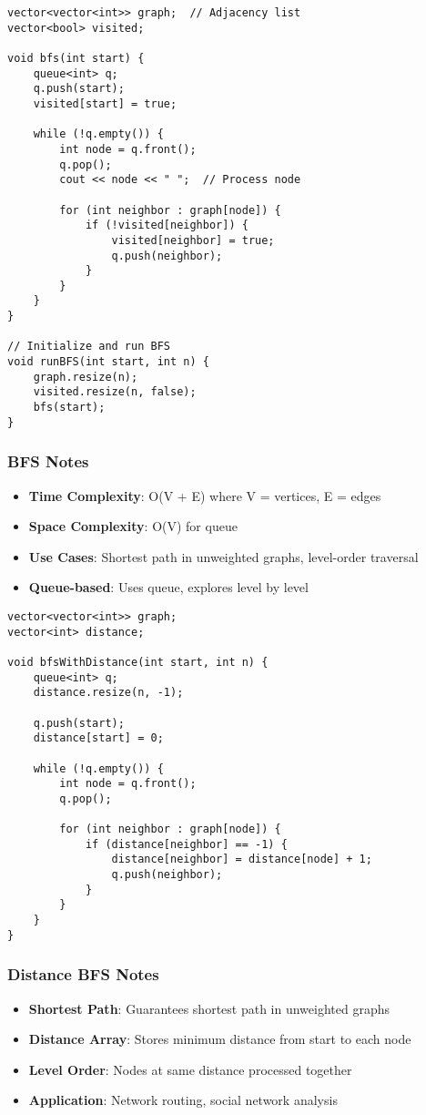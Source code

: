 \documentclass[11pt,a4paper]{article}
\begin{document}
\begin{lstlisting}[caption={BFS Implementation}]
vector<vector<int>> graph;  // Adjacency list
vector<bool> visited;

void bfs(int start) {
    queue<int> q;
    q.push(start);
    visited[start] = true;
    
    while (!q.empty()) {
        int node = q.front();
        q.pop();
        cout << node << " ";  // Process node
        
        for (int neighbor : graph[node]) {
            if (!visited[neighbor]) {
                visited[neighbor] = true;
                q.push(neighbor);
            }
        }
    }
}

// Initialize and run BFS
void runBFS(int start, int n) {
    graph.resize(n);
    visited.resize(n, false);
    bfs(start);
}
\end{lstlisting}

\subsubsection*{BFS Notes}
\begin{itemize}
\item \textbf{Time Complexity}: O(V + E) where V = vertices, E = edges
\item \textbf{Space Complexity}: O(V) for queue
\item \textbf{Use Cases}: Shortest path in unweighted graphs, level-order traversal
\item \textbf{Queue-based}: Uses queue, explores level by level
\end{itemize}

\newpage
\begin{lstlisting}[caption={BFS with Distance Calculation}]
vector<vector<int>> graph;
vector<int> distance;

void bfsWithDistance(int start, int n) {
    queue<int> q;
    distance.resize(n, -1);
    
    q.push(start);
    distance[start] = 0;
    
    while (!q.empty()) {
        int node = q.front();
        q.pop();
        
        for (int neighbor : graph[node]) {
            if (distance[neighbor] == -1) {
                distance[neighbor] = distance[node] + 1;
                q.push(neighbor);
            }
        }
    }
}
\end{lstlisting}

\subsubsection*{Distance BFS Notes}
\begin{itemize}
\item \textbf{Shortest Path}: Guarantees shortest path in unweighted graphs
\item \textbf{Distance Array}: Stores minimum distance from start to each node
\item \textbf{Level Order}: Nodes at same distance processed together
\item \textbf{Application}: Network routing, social network analysis
\end{itemize}
\end{document}
